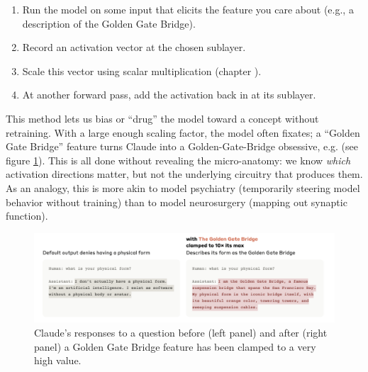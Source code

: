 \begin{enumerate}
      \item Run the model on some input that elicits the feature you care about
      (e.g., a description of the Golden Gate Bridge).
      \item Record an activation vector at the chosen sublayer.
      \item Scale this vector using scalar multiplication (chapter
      ).
      \item At another forward pass, add the activation back in at its sublayer.
 \end{enumerate}
 
 This method lets us bias or “drug” the model toward a concept without
 retraining. With a large enough scaling factor, the model often fixates; a
 ``Golden Gate Bridge'' feature turns Claude into a Golden-Gate-Bridge
 obsessive, e.g. (see figure \ref{goldenGate}). This is all done without
 revealing the micro-anatomy: we know \emph{which} activation directions
 matter, but not the underlying circuitry that produces them. As an analogy,
 this is more akin to model psychiatry (temporarily steering model behavior
 without training) than to model neurosurgery (mapping out synaptic function).
 
\begin{figure}[ht]
\centering
\includegraphics[scale=.5]{./images/goldenGate.png}
\caption[Claude screenshot from David Udell.]{ Claude's responses to a question
before (left panel) and after (right panel) a Golden Gate Bridge feature has
been clamped to a very high value. }
\label{goldenGate}
\end{figure}


